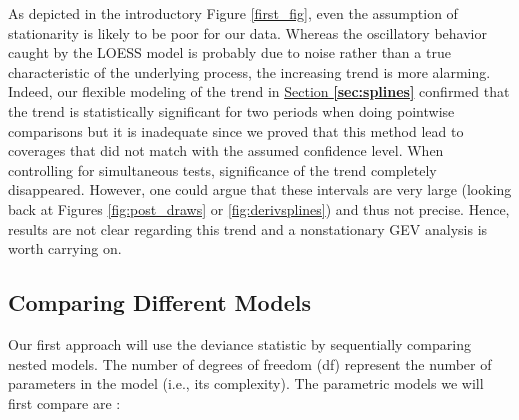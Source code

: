 As depicted in the introductory Figure \ref{first_fig}, even the assumption of stationarity is likely to be poor for our data. 
Whereas the oscillatory behavior caught by the LOESS model is probably due to noise rather than a true characteristic of the underlying process, the increasing trend is more alarming. Indeed, our flexible modeling of the trend in \hyperref[sec:splines]{Section \textbf{\ref{sec:splines}}} confirmed that the trend is statistically significant for two periods when doing pointwise comparisons but it is inadequate since we proved that this method lead to coverages that did not match with the assumed confidence level. When controlling for simultaneous tests, significance of the trend completely disappeared. However, one could argue that these intervals are very large (looking back at Figures \ref{fig:post_draws} or \ref{fig:derivsplines}) and thus not precise. Hence, results are not clear regarding this trend and a nonstationary GEV analysis is worth carrying on. 




\subsection{Comparing Different Models}\label{sec:comp0}


Our first approach will use the deviance statistic by sequentially comparing nested models. The number of degrees of freedom (df) represent the number of parameters in the model (i.e., its complexity). The parametric models we will first compare are :

